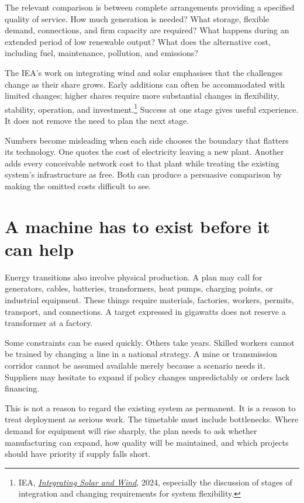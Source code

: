 \documentclass[12pt,a4paper]{book}
\begin{document}
The relevant comparison is between complete arrangements providing a specified quality of service. How much generation is needed? What storage, flexible demand, connections, and firm capacity are required? What happens during an extended period of low renewable output? What does the alternative cost, including fuel, maintenance, pollution, and emissions?

The IEA's work on integrating wind and solar emphasises that the challenges change as their share grows. Early additions can often be accommodated with limited changes; higher shares require more substantial changes in flexibility, stability, operation, and investment.\footnote{IEA, \href{https://www.iea.org/reports/integrating-solar-and-wind}{\emph{Integrating Solar and Wind}}, 2024, especially the discussion of stages of integration and changing requirements for system flexibility.} Success at one stage gives useful experience. It does not remove the need to plan the next stage.

Numbers become misleading when each side chooses the boundary that flatters its technology. One quotes the cost of electricity leaving a new plant. Another adds every conceivable network cost to that plant while treating the existing system's infrastructure as free. Both can produce a persuasive comparison by making the omitted costs difficult to see.

\section*{A machine has to exist before it can help}

Energy transitions also involve physical production. A plan may call for generators, cables, batteries, transformers, heat pumps, charging points, or industrial equipment. These things require materials, factories, workers, permits, transport, and connections. A target expressed in gigawatts does not reserve a transformer at a factory.

Some constraints can be eased quickly. Others take years. Skilled workers cannot be trained by changing a line in a national strategy. A mine or transmission corridor cannot be assumed available merely because a scenario needs it. Suppliers may hesitate to expand if policy changes unpredictably or orders lack financing.

This is not a reason to regard the existing system as permanent. It is a reason to treat deployment as serious work. The timetable must include bottlenecks. Where demand for equipment will rise sharply, the plan needs to ask whether manufacturing can expand, how quality will be maintained, and which projects should have priority if supply falls short.
\end{document}
